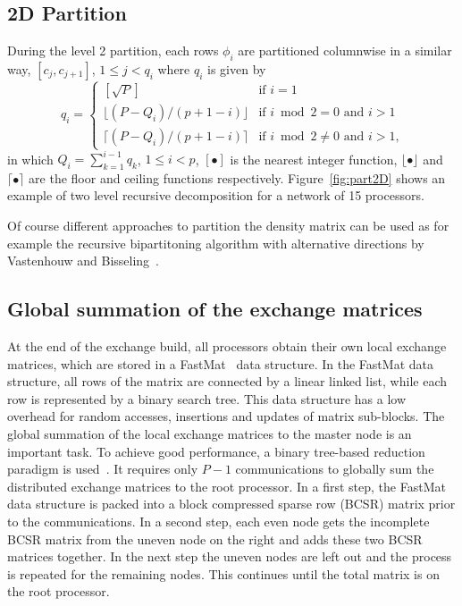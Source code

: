 \documentclass[prl,twocolumn,showpacs,twocolumngrid,superbib]{revtex4}
\begin{document}
\subsection{2D Partition}
 During the level 2 partition, each rows $\phi_i$ are partitioned columnwise in a similar way,
 $[c_j,c_{j+1}]$, $1 \le j < q_i$ where $q_i$ is given
 by 
\begin{equation}
  q_i = \left\{ \begin{array}{ll}
    [\sqrt{P}]                    & \textrm{if $i=1$}\\
    \lfloor(P-Q_i)/(p+1-i)\rfloor & \textrm{if $i\bmod2=0$ and $i>1$}\\
    \lceil (P-Q_i)/(p+1-i)\rceil  & \textrm{if $i\bmod2\ne0$ and $i>1$,}
    \end{array} \right.
\end{equation}
 in which $Q_i=\sum_{k=1}^{i-1}q_k$, $1 \le i < p$, $[\bullet]$ 
 is the nearest integer function, $\lfloor\bullet\rfloor$ and $\lceil\bullet\rceil$
 are the floor and ceiling functions respectively.
 Figure~\ref{fig:part2D} shows an example of two level recursive decomposition
 for a network of 15 processors.
 
 Of course different approaches to partition the density matrix can be 
 used as for example the recursive bipartitoning algorithm with
 alternative directions by Vastenhouw and Bisseling~\cite{BVastenhouw}.

\subsection{Global summation of the exchange matrices}
 At the end of the exchange build, all processors obtain their own local
 exchange matrices, which are stored in a FastMat~\cite{CGan04B} data
 structure. In the FastMat data structure, all rows of the matrix 
 are connected by a linear linked list, while each row is represented
 by a binary search tree. This data structure has a low overhead for random
 accesses, insertions and updates of matrix sub-blocks.
 The global summation of the local exchange matrices to the master node is
 an important task. To achieve good performance, a binary tree-based 
 reduction paradigm is used~\cite{GFox88,RGeijn91}. It requires 
 only $P-1$ communications to globally
 sum the distributed exchange matrices to the root processor.
 In a first step, the FastMat data structure is packed into a 
 block compressed sparse row (BCSR) matrix
 prior to the communications. In a second step,
 each even node gets the incomplete BCSR matrix from the 
 uneven node on the right and adds these two BCSR matrices together. 
 In the next step the uneven nodes are left out and the process 
 is repeated for the remaining nodes. This continues until the total 
 matrix is on the root processor. 
\end{document}
